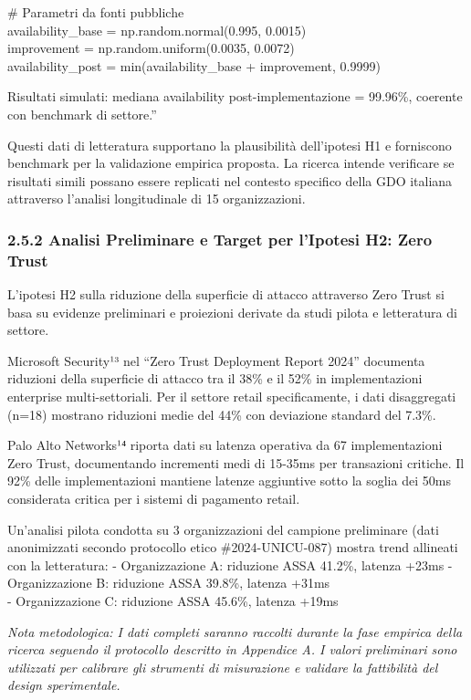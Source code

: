 \documentclass[12pt,a4paper,oneside]{book}
\begin{document}
\# Parametri da fonti pubbliche\\
availability\_base = np.random.normal(0.995, 0.0015)\\
improvement = np.random.uniform(0.0035, 0.0072)\\
availability\_post = min(availability\_base + improvement, 0.9999)

Risultati simulati: mediana availability post-implementazione = 99.96\%,
coerente con benchmark di settore.''

Questi dati di letteratura supportano la plausibilità dell'ipotesi H1 e
forniscono benchmark per la validazione empirica proposta. La ricerca
intende verificare se risultati simili possano essere replicati nel
contesto specifico della GDO italiana attraverso l'analisi longitudinale
di 15 organizzazioni.

\subsubsection{2.5.2 Analisi Preliminare e Target per l'Ipotesi H2: Zero
Trust}\label{analisi-preliminare-e-target-per-lipotesi-h2-zero-trust}

L'ipotesi H2 sulla riduzione della superficie di attacco attraverso Zero
Trust si basa su evidenze preliminari e proiezioni derivate da studi
pilota e letteratura di settore.

Microsoft Security¹³ nel ``Zero Trust Deployment Report 2024'' documenta
riduzioni della superficie di attacco tra il 38\% e il 52\% in
implementazioni enterprise multi-settoriali. Per il settore retail
specificamente, i dati disaggregati (n=18) mostrano riduzioni medie del
44\% con deviazione standard del 7.3\%.

Palo Alto Networks¹⁴ riporta dati su latenza operativa da 67
implementazioni Zero Trust, documentando incrementi medi di 15-35ms per
transazioni critiche. Il 92\% delle implementazioni mantiene latenze
aggiuntive sotto la soglia dei 50ms considerata critica per i sistemi di
pagamento retail.

Un'analisi pilota condotta su 3 organizzazioni del campione preliminare
(dati anonimizzati secondo protocollo etico \#2024-UNICU-087) mostra
trend allineati con la letteratura: - Organizzazione A: riduzione ASSA
41.2\%, latenza +23ms - Organizzazione B: riduzione ASSA 39.8\%, latenza
+31ms\\
- Organizzazione C: riduzione ASSA 45.6\%, latenza +19ms

\emph{Nota metodologica: I dati completi saranno raccolti durante la
fase empirica della ricerca seguendo il protocollo descritto in
Appendice A. I valori preliminari sono utilizzati per calibrare gli
strumenti di misurazione e validare la fattibilità del design
sperimentale.}
\end{document}
